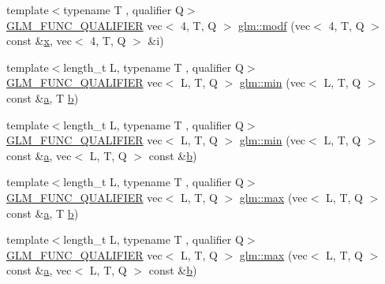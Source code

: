 \begin{DoxyCompactItemize}
\item 
{\footnotesize template$<$typename T , qualifier Q$>$ }\\\hyperlink{setup_8hpp_a33fdea6f91c5f834105f7415e2a64407}{G\+L\+M\+\_\+\+F\+U\+N\+C\+\_\+\+Q\+U\+A\+L\+I\+F\+I\+ER} vec$<$ 4, T, Q $>$ \hyperlink{namespaceglm_a415c6e0838a276a74f7ad598ff57befb}{glm\+::modf} (vec$<$ 4, T, Q $>$ const \&\hyperlink{_s_d_l__opengl_8h_ad0e63d0edcdbd3d79554076bf309fd47}{x}, vec$<$ 4, T, Q $>$ \&i)
\item 
{\footnotesize template$<$length\+\_\+t L, typename T , qualifier Q$>$ }\\\hyperlink{setup_8hpp_a33fdea6f91c5f834105f7415e2a64407}{G\+L\+M\+\_\+\+F\+U\+N\+C\+\_\+\+Q\+U\+A\+L\+I\+F\+I\+ER} vec$<$ L, T, Q $>$ \hyperlink{group__core__func__common_ga2d274e8b537c173dba983331a2620736}{glm\+::min} (vec$<$ L, T, Q $>$ const \&\hyperlink{_s_d_l__opengl__glext_8h_a3309789fc188587d666cda5ece79cf82}{a}, T \hyperlink{_s_d_l__opengl__glext_8h_a0f71581a41fd2264c8944126dabbd010}{b})
\item 
{\footnotesize template$<$length\+\_\+t L, typename T , qualifier Q$>$ }\\\hyperlink{setup_8hpp_a33fdea6f91c5f834105f7415e2a64407}{G\+L\+M\+\_\+\+F\+U\+N\+C\+\_\+\+Q\+U\+A\+L\+I\+F\+I\+ER} vec$<$ L, T, Q $>$ \hyperlink{group__core__func__common_ga734a374ca5c808e7bd9f74b6acfd7478}{glm\+::min} (vec$<$ L, T, Q $>$ const \&\hyperlink{_s_d_l__opengl__glext_8h_a3309789fc188587d666cda5ece79cf82}{a}, vec$<$ L, T, Q $>$ const \&\hyperlink{_s_d_l__opengl__glext_8h_a0f71581a41fd2264c8944126dabbd010}{b})
\item 
{\footnotesize template$<$length\+\_\+t L, typename T , qualifier Q$>$ }\\\hyperlink{setup_8hpp_a33fdea6f91c5f834105f7415e2a64407}{G\+L\+M\+\_\+\+F\+U\+N\+C\+\_\+\+Q\+U\+A\+L\+I\+F\+I\+ER} vec$<$ L, T, Q $>$ \hyperlink{group__core__func__common_gae8b0964d30deabd0867b8d7ac44f067e}{glm\+::max} (vec$<$ L, T, Q $>$ const \&\hyperlink{_s_d_l__opengl__glext_8h_a3309789fc188587d666cda5ece79cf82}{a}, T \hyperlink{_s_d_l__opengl__glext_8h_a0f71581a41fd2264c8944126dabbd010}{b})
\item 
{\footnotesize template$<$length\+\_\+t L, typename T , qualifier Q$>$ }\\\hyperlink{setup_8hpp_a33fdea6f91c5f834105f7415e2a64407}{G\+L\+M\+\_\+\+F\+U\+N\+C\+\_\+\+Q\+U\+A\+L\+I\+F\+I\+ER} vec$<$ L, T, Q $>$ \hyperlink{group__core__func__common_gad48b723358c68d45477c22ff0101985e}{glm\+::max} (vec$<$ L, T, Q $>$ const \&\hyperlink{_s_d_l__opengl__glext_8h_a3309789fc188587d666cda5ece79cf82}{a}, vec$<$ L, T, Q $>$ const \&\hyperlink{_s_d_l__opengl__glext_8h_a0f71581a41fd2264c8944126dabbd010}{b})

\end{DoxyCompactItemize}
